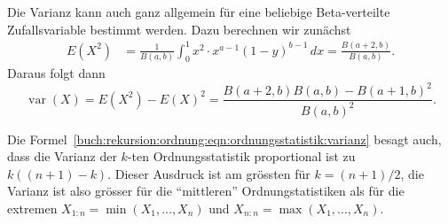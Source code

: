 Die Varianz kann auch ganz allgemein für eine beliebige Beta-verteilte
Zufallsvariable bestimmt werden.
Dazu berechnen wir zunächst
\begin{align*}
E(X^2)
&=
\frac{1}{B(a,b)}
\int_0^1
x^2\cdot x^{a-1}(1-y)^{b-1}\,dx
=
\frac{B(a+2,b)}{B(a,b)}.
\end{align*}
Daraus folgt dann 
\[
\operatorname{var}(X)
=
E(X^2)-E(X)^2
=
\frac{B(a+2,b)B(a,b)-B(a+1,b)^2}{B(a,b)^2}.
\]

Die Formel~\eqref{buch:rekursion:ordnung:eqn:ordnungsstatistik:varianz}
besagt auch, dass die Varianz der $k$-ten Ordnungsstatistik proportional
ist zu $k((n+1)-k)$.
Dieser Ausdruck ist am grössten für $k=(n+1)/2$, die Varianz ist
also grösser für die ``mittleren'' Ordnungstatistiken als für die
extremen $X_{1:n}=\operatorname{min}(X_1,\dots,X_n)$ und
$X_{n:n}=\operatorname{max}(X_1,\dots,X_n)$.


